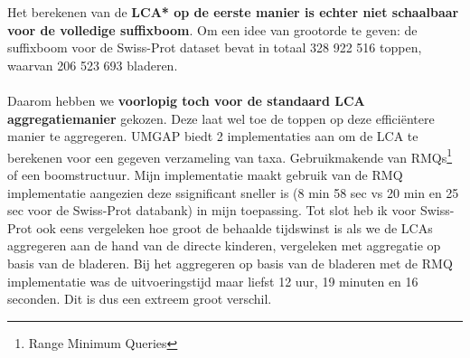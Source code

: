 Het berekenen van de \textbf{LCA* op de eerste manier is echter niet schaalbaar voor de volledige suffixboom}.
Om een idee van grootorde te geven: de suffixboom voor de Swiss-Prot dataset bevat in totaal 328 922 516 toppen, waarvan 206 523 693 bladeren.
\\ \\
Daarom hebben we \textbf{voorlopig toch voor de standaard LCA aggregatiemanier} gekozen.
Deze laat wel toe de toppen op deze efficiëntere manier te aggregeren.
UMGAP biedt 2 implementaties aan om de LCA te berekenen voor een gegeven verzameling van taxa.
Gebruikmakende van RMQs\footnote{Range Minimum Queries} of een boomstructuur.
Mijn implementatie maakt gebruik van de RMQ implementatie aangezien deze ssignificant sneller is (8 min 58 sec vs 20 min en 25 sec voor de Swiss-Prot databank) in mijn toepassing.
Tot slot heb ik voor Swiss-Prot ook eens vergeleken hoe groot de behaalde tijdswinst is als we de LCAs aggregeren aan de hand van de directe kinderen, vergeleken met aggregatie op basis van de bladeren.
Bij het aggregeren op basis van de bladeren met de RMQ implementatie was de uitvoeringstijd maar liefst 12 uur, 19 minuten en 16 seconden.
Dit is dus een extreem groot verschil.


